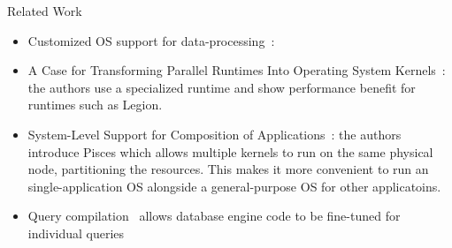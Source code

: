 \begin{block}{Related Work}
  \begin{itemize}
      \item Customized OS support for data-processing~\cite{GICEVA:2016:OS_SUPPORT}: 
      \item A Case for Transforming Parallel Runtimes Into Operating System Kernels~\cite{HALE:2015:NAUTILUS}: the authors use a specialized runtime and show performance benefit for runtimes such as Legion.
      \item System-Level Support for Composition of Applications~\cite{KOCOLOSKI:2015:PISCES}: the authors introduce Pisces which allows multiple kernels to run on the same physical node, partitioning the resources. This makes it more convenient to run an single-application OS alongside a general-purpose OS for other applicatoins.
  \item Query compilation~\cite{SK16,N11} allows database engine code to be fine-tuned for individual queries
  \end{itemize}
  
\end{block}
